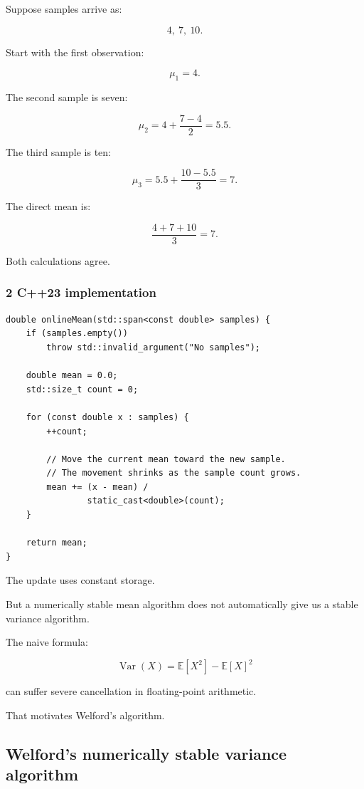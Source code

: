 Suppose samples arrive as:

\[
 4,\ 7,\ 10.
\]

Start with the first observation:

\[
 \mu_1=4.
\]

The second sample is seven:

\[
 \mu_2 = 4+\frac{7-4}{2} =5.5.
\]

The third sample is ten:

\[
 \mu_3 = 5.5+\frac{10-5.5}{3} =7.
\]

The direct mean is:

\[
 \frac{4+7+10}{3}=7.
\]

Both calculations agree.

\subsubsection{2 C++23 implementation}\label{02-foundations-ii-ch030-c23-implementation}

\begin{verbatim}
double onlineMean(std::span<const double> samples) {
    if (samples.empty())
        throw std::invalid_argument("No samples");

    double mean = 0.0;
    std::size_t count = 0;

    for (const double x : samples) {
        ++count;

        // Move the current mean toward the new sample.
        // The movement shrinks as the sample count grows.
        mean += (x - mean) /
                static_cast<double>(count);
    }

    return mean;
}
\end{verbatim}

The update uses constant storage.

But a numerically stable mean algorithm does not automatically give us a stable variance algorithm.

The naive formula:

\[
 \operatorname{Var}(X)= \mathbb E[X^2]-\mathbb E[X]^2
\]

can suffer severe cancellation in floating-point arithmetic.

That motivates Welford's algorithm.

\subsection{Welford's numerically stable variance algorithm}\label{02-foundations-ii-ch030-welfords-numerically-stable-variance-algorithm}

